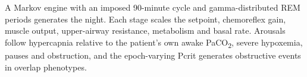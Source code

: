 \begin{summarybox}
A Markov engine with an imposed 90-minute cycle and gamma-distributed REM periods generates the night. Each stage scales the setpoint, chemoreflex gain, muscle output, upper-airway resistance, metabolism and basal rate. Arousals follow hypercapnia relative to the patient's own awake PaCO\textsubscript{2}, severe hypoxemia, pauses and obstruction, and the epoch-varying Pcrit generates obstructive events in overlap phenotypes.
\end{summarybox}
